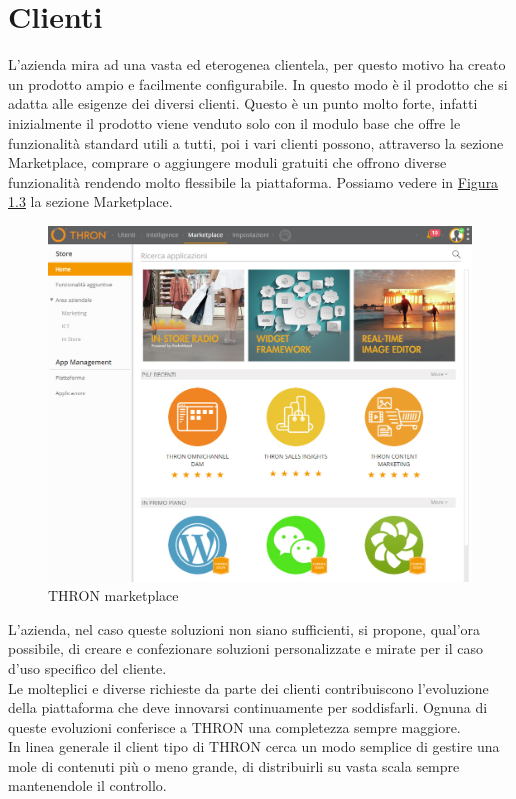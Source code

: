 \documentclass[a4paper, 12pt, twoside, openright]{book}
\newcommand{\gloss}[1]{#1\textsubscript{\textit{\tiny{G}}}}
\begin{document}
\newpage{}
\section{Clienti}
L'azienda mira ad una vasta ed eterogenea clientela, per questo motivo ha creato un prodotto ampio e facilmente configurabile. In questo modo è il prodotto che si adatta alle esigenze dei diversi clienti. Questo è un punto molto forte, infatti inizialmente il prodotto viene venduto solo con il modulo base che offre le funzionalità standard utili a tutti, poi i vari clienti possono, attraverso la sezione Marketplace, comprare o aggiungere moduli gratuiti che offrono diverse funzionalità rendendo molto flessibile la piattaforma. Possiamo vedere in \hyperref[thron-marketplace]{Figura 1.3} la sezione Marketplace.
\begin{figure}[H]
	\centering
	\label{thron-marketplace}
	\includegraphics[width=1.0\textwidth]{images/thron-marketplace.jpg}
	\caption{THRON marketplace}
\end{figure}
L'azienda, nel caso queste soluzioni non siano sufficienti, si propone, qual'ora possibile, di creare e confezionare soluzioni personalizzate e mirate per il caso d'uso specifico del cliente.\\
Le molteplici e diverse richieste da parte dei clienti contribuiscono l'evoluzione della piattaforma che deve innovarsi continuamente per soddisfarli. Ognuna di queste evoluzioni conferisce a THRON una completezza sempre maggiore.\\
In linea generale il client tipo di THRON cerca un modo semplice di gestire una mole di contenuti più o meno grande, di distribuirli su vasta scala sempre mantenendole il controllo.\\
\end{document}
